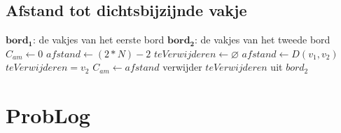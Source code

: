 \documentclass{article}
\begin{document}
  \subsection{Afstand tot dichtsbijzijnde vakje}
  \begin{minipage}{\linewidth}
  \vspace{-\baselineskip}
\begin{algorithm}[H]
\begin{algorithmic}[1]
 \State $\mathbf{bord_1}$: {de vakjes van het eerste bord}
 \State $\mathbf{bord_2}$: {de vakjes van het tweede bord}
 \State $C_{am} \gets 0$
 	\State $afstand \gets (2*N)-2$
 	\State $teVerwijderen \gets \varnothing$
   				\State $afstand \gets D(v_1,v_2)$
   				\State $teVerwijderen = v_2$
  			\EndIf
  		\EndFor
  		\State $C_{am} \gets afstand$
  	\EndIf
  	\State verwijder $teVerwijderen$ uit $bord_2$
  	\EndIf
  \EndFor
  \end{algorithmic}
  \end{algorithm}
  \end{minipage}

\section{ProbLog}
\end{document}
